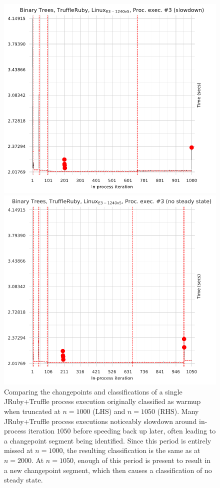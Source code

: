 \documentclass[acmsmall,screen]{acmart}
\begin{document}
\begin{figure}[!tbp]
\centering
\begin{minipage}[t]{0.485\textwidth}
\includegraphics[width=\textwidth]{examples/truncated1.pdf}
\end{minipage}
\hfill
\begin{minipage}[t]{0.485\textwidth}
\includegraphics[width=\textwidth]{examples/truncated2.pdf}
\end{minipage}
\caption{Comparing the changepoints and classifications of a
single JRuby+Truffle process execution originally classified as warmup when
truncated at $n=1000$ (LHS) and $n=1050$ (RHS). Many JRuby+Truffle process
executions noticeably slowdown around in-process iteration $1050$ before
speeding back up later, often leading to a changepoint segment
being identified. Since this period is entirely missed at $n=1000$,
the resulting classification is the same as at $n=2000$. At $n=1050$,
enough of this period is present to result in a new changepoint
segment, which then causes a classification of no steady state.}
\label{fig:truncated}
\end{figure}
\end{document}
